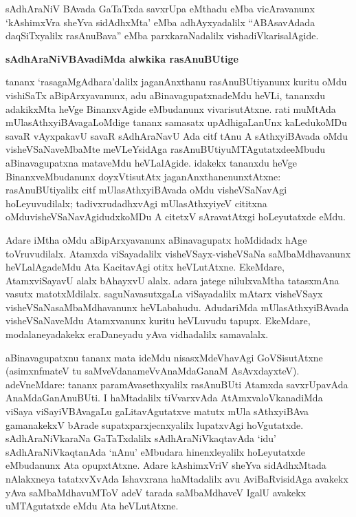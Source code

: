sAdhAraNiV BAvada GaTaTxda savxrUpa eMthadu eMba vicAravanunx `kAshimxVra sheYva sidAdhxMta' eMba adhAyxyadalilx ``ABAsavAdada daqSiTxyalilx rasAnuBava'' eMba parxkaraNadalilx vishadiVkarisalAgide.

\newpage

\begin{center}
{\Large\bf sAdhAraNiVBAvadiMda alwkika rasAnuBUtige}
\end{center}

tananx `rasagaMgAdhara'dalilx jaganAnxthanu rasAnuBUtiyanunx kuritu oMdu vishiSaTx aBipArxyavanunx, adu aBinavagupatxnadeMdu heVLi, tananxdu adakikxMta heVge BinanxvAgide eMbudanunx vivarisutAtxne. rati muMtAda mUlasAthxyiBAvagaLoMdige tananx samasatx upAdhigaLanUnx kaLedukoMDu savaR vAyxpakavU savaR sAdhAraNavU Ada citf tAnu A sAthxyiBAvada oMdu visheVSaNaveMbaMte meVLeYsidAga rasAnuBUtiyuMTAgutatxde\break eMbudu aBinavagupatxna mataveMdu heVLalAgide. idakekx tananxdu heVge Binanx\-veMbudanunx doyxVtisutAtx jaganAnxthanenunxtAtxne: rasAnuBUtiyalilx citf mUlasAthxyiBAvada oMdu visheVSaNavAgi hoLeyuvudilalx; tadivxrudadhxvAgi mUlasAthxyiyeV cititxna oMdu\break visheVSaNavAgidudxkoMDu A citetxV sAravatAtxgi hoLeyutatxde eMdu.

Adare iMtha oMdu aBipArxyavanunx aBinavagupatx hoMdidadx hAge toVruvu\-dilalx. Atamxda viSayadalilx visheVSayx-visheVSaNa saMbaMdhavanunx heVLalAgadeMdu Ata KacitavAgi otitx heVLutAtxne. EkeMdare, AtamxviSayavU alalx bAhayxvU alalx. adara jatege nilulxvaMtha tatasxmAna vasutx matotxMdilalx. saguNavasutxgaLa viSayadalilx mAtarx visheVSayx visheVSaNasaMbaMdhavanunx heVLabahudu. AdudariMda mUlasAthxyiBAvada visheVSaNaveMdu Atamxvanunx kuritu heVLuvudu tapupx. EkeMdare, modalaneyadakekx eraDaneyadu yAva vidhadalilx samavalalx.

aBinavagupatxnu tananx mata ideMdu nisasxMdeVhavAgi GoVSisutAtxne (asimxnfmateV tu saMveVdanameVvAnaMdaGanaM AsAvxdayxteV). adeVneMdare: tananx paramAvasethxyalilx rasAnuBUti Atamxda savxrUpavAda AnaMdaGanAnuBUti. I haMtadalilx tiVvarxvAda AtAmxvaloVkanadiMda viSaya viSayiVBAvagaLu gaLitavAgutatxve matutx mUla sAthxyiBAva gamanakekxV bArade supatxparxjecnxyalilx lupatxvAgi hoVgutatxde. sAdhAraNiVkaraNa GaTaTxdalilx sAdhAraNiVkaqtavAda `idu' sAdhAraNiVkaqtanAda `nAnu' eMbudara hinenxleyalilx hoLeyutatxde eMbudanunx Ata opupxtAtxne. Adare kAshimxVriV sheYva sidAdhxMtada nAlakxneya tatatxvXvAda Ishavxrana haMtadalilx avu AviBaRvisidAga avakekx yAva saMbaMdhavuMToV adeV tarada saMbaMdhaveV IgalU avakekx uMTAgutatxde eMdu Ata heVLutAtxne.

